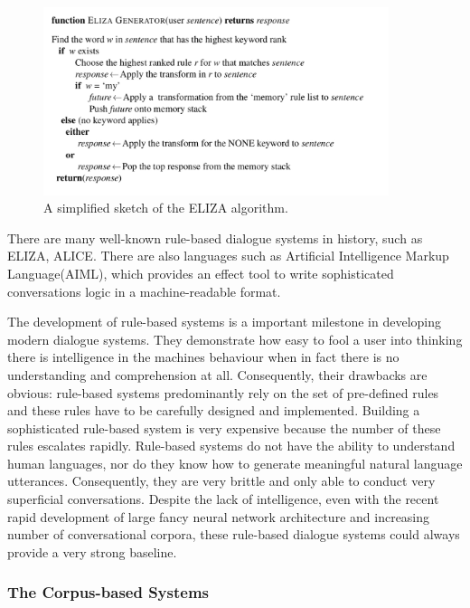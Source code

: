 \documentclass[bsc,frontabs,twoside,singlespacing,parskip,deptreport]{infthesis}     %
\begin{document}
\begin{figure}[h]
    \centering
    \includegraphics[width=0.9\textwidth]{elizarule.jpeg}
    \caption{A simplified sketch of the ELIZA algorithm.}
    \label{fig:elizarule}
\end{figure}

There are many well-known rule-based dialogue systems in history, such as ELIZA\cite{weizenbaum1966eliza}, ALICE\cite{wallace1995artificial}. There are also languages such as Artificial Intelligence Markup Language(AIML), which provides an effect tool to write sophisticated conversations logic in a machine-readable format\cite{wallace1995artificial}.

The development of rule-based systems is a important milestone in developing modern dialogue systems. They demonstrate how easy to fool a user into thinking there is intelligence in the machines behaviour when in fact there is no understanding and comprehension at all. Consequently, their drawbacks are obvious: rule-based systems predominantly rely on the set of pre-defined rules and these rules have to be carefully designed and implemented. Building a sophisticated rule-based system is very expensive because the number of these rules escalates rapidly. Rule-based systems do not have the ability to understand human languages, nor do they know how to generate meaningful natural language utterances\cite{jiweilithesis}. Consequently, they are very brittle and only able to conduct very superficial conversations. Despite the lack of intelligence, even with the recent rapid development of large fancy neural network architecture and increasing number of conversational corpora, these rule-based dialogue systems could always provide a very strong baseline.


\subsubsection*{The Corpus-based Systems}
\end{document}
